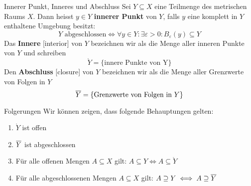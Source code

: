 \begin{definition}{Innerer Punkt, Inneres und Abschluss}{}
Sei $Y \subseteq X$ eine Teilmenge des metrischen Raums $X$. Dann heisst $y \in Y$ \textbf{innerer Punkt} von $Y$, falls $y$ eine komplett in $Y$ enthaltene Umgebung besitzt:
$$Y \text{ abgeschlossen} \iff \forall y \in Y: \exists\varepsilon>0: B_\varepsilon(y) \subseteq Y$$
Das \textbf{Innere} [interior] von $Y$ bezeichnen wir als die Menge aller inneren Punkte von $Y$ und schreiben
$$\mathring{Y} = \{\text{innere Punkte von Y}\}$$
Den \textbf{Abschluss} [closure] von $Y$ bezeichnen wir als die Menge aller Grenzwerte von Folgen in $Y$
$$\overline{Y} = \{\text{Grenzwerte von Folgen in }Y\}$$
\end{definition}
\begin{lemma}{Folgerungen}{}
Wir können zeigen, dass folgende Behauptungen gelten:
\begin{enumerate}[label=\alph*)]
    \item $\mathring{Y}$ ist offen
    \item $\overline{Y}$ ist abgeschlossen
    \item Für alle offenen Mengen $A \subseteq X$ gilt: $A \subseteq Y \iff A \subseteq \mathring{Y}$
    \item Für alle abgeschlossenen Mengen $A \subseteq X$ gilt: $A \supseteq Y \iff A \supseteq \overline{Y}$
\end{enumerate}
\end{lemma}
